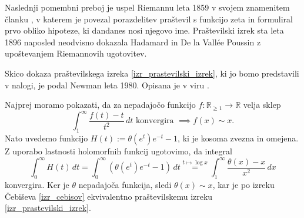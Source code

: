 Naslednji pomembni preboj je uspel Riemannu leta 1859 v svojem znamenitem članku \cite{Riemann_1859}, v katerem je povezal porazdelitev praštevil s funkcijo zeta in formuliral prvo obliko hipoteze, ki dandanes nosi njegovo ime.
Praštevilski izrek sta leta 1896 naposled neodvisno dokazala Hadamard in De la Vallée Poussin z upoštevanjem Riemannovih ugotovitev. 

Skico dokaza praštevilskega izreka \ref{izr_prastevilski_izrek}, ki jo bomo predstavili v nalogi, je podal Newman leta 1980. Opisana je v viru \cite[str.~9]{mit_lecture_notes_2021}. 
\begin{skica}
Najprej moramo pokazati, da za nepadajočo funkcijo $f : \mathbb{R}_{\ge  1} \to \mathbb{R}$
velja sklep \begin{equation*}
\int_{1}^{\infty} \frac{f(t) - t}{t^2} \, dt \text{ konvergira } \implies f(x) \sim x. 
\end{equation*}  
  Nato uvedemo funkcijo $H(t) := \theta(e^{t} )e^{-t} - 1$, ki je kosoma zvezna in omejena. Z uporabo lastnosti holomorfnih funkcij ugotovimo, da integral \begin{equation*}
  \int_{0}^{\infty} H(t)   \, dt = \int_{0}^{\infty} (\theta(e^{t} )e^{-t} - 1)  \, dt  \stackrel{t \mapsto \log x}{=} \int_{1}^{\infty}  \frac{\theta(x) -x }{x^2} \, dx 
  \end{equation*}  
   konvergira. Ker je $\theta$ nepadajoča funkcija, sledi $\theta(x) \sim x$, kar je po izreku Čebiševa \ref{izr_cebisov} ekvivalentno praštevilskemu izreku \ref{izr_prastevilski_izrek}.  
\end{skica}


